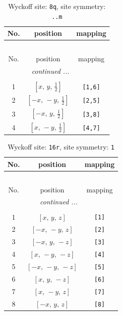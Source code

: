 \documentclass[fleqn,8pt]{jsarticle}
\begin{document}
\renewcommand{\arraystretch}{1.2}
\begin{longtable}{ccc}
\caption{Wyckoff site: {\tt 8q}, site symmetry: {\tt ..m}}
 \\
 \hline \hline
No. & position & mapping \\ \hline \endfirsthead

\multicolumn{2}{l}{\tablename\ \thetable{}} \\
 \hline \hline
No. & position & mapping \\ \hline \endhead

 \hline \hline
\multicolumn{2}{r}{\footnotesize\it continued ...} \\ \endfoot

 \hline \hline
\multicolumn{2}{r}{} \\ \endlastfoot

1 & $\left[ x,\, y,\, \frac{1}{2} \right]$ & {\tt [1,6]} \\ \hline
2 & $\left[ - x,\, - y,\, \frac{1}{2} \right]$ & {\tt [2,5]} \\ \hline
3 & $\left[ - x,\, y,\, \frac{1}{2} \right]$ & {\tt [3,8]} \\ \hline
4 & $\left[ x,\, - y,\, \frac{1}{2} \right]$ & {\tt [4,7]} \\
\end{longtable}
\renewcommand{\arraystretch}{1.2}
\begin{longtable}{ccc}
\caption{Wyckoff site: {\tt 16r}, site symmetry: {\tt 1}}
 \\
 \hline \hline
No. & position & mapping \\ \hline \endfirsthead

\multicolumn{2}{l}{\tablename\ \thetable{}} \\
 \hline \hline
No. & position & mapping \\ \hline \endhead

 \hline \hline
\multicolumn{2}{r}{\footnotesize\it continued ...} \\ \endfoot

 \hline \hline
\multicolumn{2}{r}{} \\ \endlastfoot

1 & $\left[ x,\, y,\, z \right]$ & {\tt [1]} \\ \hline
2 & $\left[ - x,\, - y,\, z \right]$ & {\tt [2]} \\ \hline
3 & $\left[ - x,\, y,\, - z \right]$ & {\tt [3]} \\ \hline
4 & $\left[ x,\, - y,\, - z \right]$ & {\tt [4]} \\ \hline
5 & $\left[ - x,\, - y,\, - z \right]$ & {\tt [5]} \\ \hline
6 & $\left[ x,\, y,\, - z \right]$ & {\tt [6]} \\ \hline
7 & $\left[ x,\, - y,\, z \right]$ & {\tt [7]} \\ \hline
8 & $\left[ - x,\, y,\, z \right]$ & {\tt [8]} \\
\end{longtable}
\end{document}
